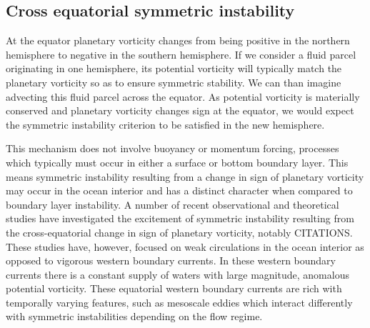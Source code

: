 \subsection{Cross equatorial symmetric instability}
At the equator planetary vorticity changes from being positive in the northern hemisphere to negative in the southern hemisphere. If we consider a fluid parcel originating in one hemisphere, its potential vorticity will typically match the planetary vorticity so as to ensure symmetric stability. We can than imagine advecting this fluid parcel across the equator. As potential vorticity is materially conserved and planetary vorticity changes sign at the equator, we would expect the symmetric instability criterion to be satisfied in the new hemisphere.

This mechanism does not involve buoyancy or momentum forcing, processes which typically must occur in either a surface or bottom boundary layer. This means symmetric instability resulting from a change in sign of planetary vorticity may occur in the ocean interior and has a distinct character when compared to boundary layer instability. A number of recent observational and theoretical studies have investigated the excitement of symmetric instability resulting from the cross-equatorial change in sign of planetary vorticity, notably CITATIONS. These studies have, however, focused on weak circulations in the ocean interior as opposed to vigorous western boundary currents. In these western boundary currents there is a constant supply of waters with large magnitude, anomalous potential vorticity. These equatorial western boundary currents are rich with temporally varying features, such as mesoscale eddies which interact differently with symmetric instabilities depending on the flow regime.